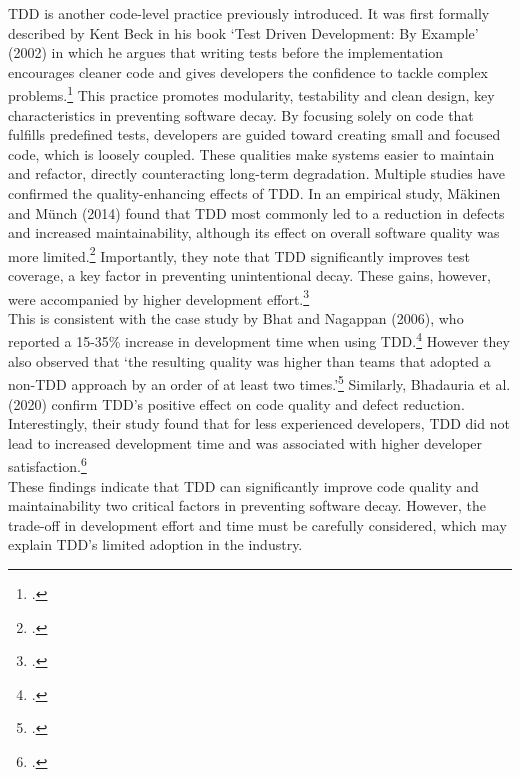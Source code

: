 \ac{TDD} is another code-level practice previously introduced. It was first formally described by Kent Beck in his book
`Test Driven Development: By Example' (2002) in which he argues that writing tests before the implementation
encourages cleaner code and gives developers the confidence to tackle complex problems.\footcite[pp. 8-9]{beckTestdrivenDevelopmentExample2002}
This practice promotes modularity, testability and clean design, key characteristics in preventing software decay. By focusing solely on code
that fulfills predefined tests, developers are guided toward creating small and focused code, which is loosely coupled. These qualities make systems
easier to maintain and refactor, directly counteracting long-term degradation.
Multiple studies have confirmed the quality-enhancing effects of \ac{TDD}.
In an empirical study, Mäkinen and Münch (2014) found that  TDD most commonly led to a reduction in defects and increased maintainability, 
although its effect on overall software quality was more limited.\footcite[13]{inproceedings}
Importantly, they note that TDD significantly improves test coverage, a key factor in preventing unintentional decay.
These gains, however, were accompanied by higher development effort.\footcite[13]{inproceedings}\\
This is consistent with the case study by Bhat and Nagappan (2006), who reported a 15-35\% increase in development time when using \ac{TDD}.\footcite[361]{bhatEvaluatingEfficacyTestdriven2006a}
However they also observed that `the resulting quality was higher than teams that adopted a non-TDD approach by an order of at least two times.'\footcite[361]{bhatEvaluatingEfficacyTestdriven2006a}
Similarly, Bhadauria et al. (2020) confirm TDD’s positive effect on code quality and defect reduction.
Interestingly, their study found that for less experienced developers, TDD did not lead to increased development time and was associated with higher developer satisfaction.\footcite[1058]{bhadauriaPerformanceOutcomesTestDriven2020}\\
These findings indicate that TDD can significantly improve code quality and maintainability two critical factors in preventing software decay.
However, the trade-off in development effort and time must be carefully considered, which may explain TDD's limited adoption in the industry.\\

